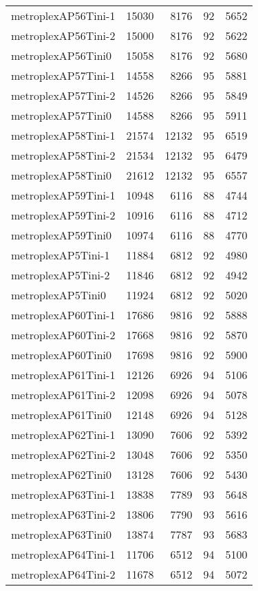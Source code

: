 \begin{longtable}{lrrrr}
metroplexAP56Tini-1 & 15030 & 8176 & 92 & 5652 \\
metroplexAP56Tini-2 & 15000 & 8176 & 92 & 5622 \\
metroplexAP56Tini0 & 15058 & 8176 & 92 & 5680 \\
metroplexAP57Tini-1 & 14558 & 8266 & 95 & 5881 \\
metroplexAP57Tini-2 & 14526 & 8266 & 95 & 5849 \\
metroplexAP57Tini0 & 14588 & 8266 & 95 & 5911 \\
metroplexAP58Tini-1 & 21574 & 12132 & 95 & 6519 \\
metroplexAP58Tini-2 & 21534 & 12132 & 95 & 6479 \\
metroplexAP58Tini0 & 21612 & 12132 & 95 & 6557 \\
metroplexAP59Tini-1 & 10948 & 6116 & 88 & 4744 \\
metroplexAP59Tini-2 & 10916 & 6116 & 88 & 4712 \\
metroplexAP59Tini0 & 10974 & 6116 & 88 & 4770 \\
metroplexAP5Tini-1 & 11884 & 6812 & 92 & 4980 \\
metroplexAP5Tini-2 & 11846 & 6812 & 92 & 4942 \\
metroplexAP5Tini0 & 11924 & 6812 & 92 & 5020 \\
metroplexAP60Tini-1 & 17686 & 9816 & 92 & 5888 \\
metroplexAP60Tini-2 & 17668 & 9816 & 92 & 5870 \\
metroplexAP60Tini0 & 17698 & 9816 & 92 & 5900 \\
metroplexAP61Tini-1 & 12126 & 6926 & 94 & 5106 \\
metroplexAP61Tini-2 & 12098 & 6926 & 94 & 5078 \\
metroplexAP61Tini0 & 12148 & 6926 & 94 & 5128 \\
metroplexAP62Tini-1 & 13090 & 7606 & 92 & 5392 \\
metroplexAP62Tini-2 & 13048 & 7606 & 92 & 5350 \\
metroplexAP62Tini0 & 13128 & 7606 & 92 & 5430 \\
metroplexAP63Tini-1 & 13838 & 7789 & 93 & 5648 \\
metroplexAP63Tini-2 & 13806 & 7790 & 93 & 5616 \\
metroplexAP63Tini0 & 13874 & 7787 & 93 & 5683 \\
metroplexAP64Tini-1 & 11706 & 6512 & 94 & 5100 \\
metroplexAP64Tini-2 & 11678 & 6512 & 94 & 5072 \\

\end{longtable}
